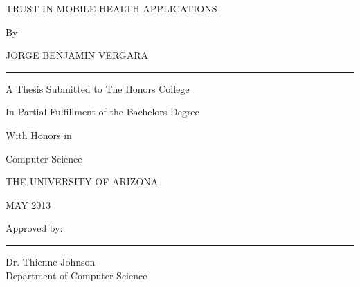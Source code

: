 \thispagestyle{empty}
\begin{center}
TRUST IN MOBILE HEALTH APPLICATIONS

By

JORGE BENJAMIN VERGARA

\vspace*{1 in}
\rule{1.5in}{.1pt}
\vspace*{1 in}

A Thesis Submitted to The Honors College

In Partial Fulfillment of the Bachelors Degree

With Honors in

Computer Science

THE UNIVERSITY OF ARIZONA

MAY 2013
\end{center}
\vfill
Approved by:

\vspace*{.3 in}
\rule{2in}{.1pt}

Dr. Thienne Johnson\\
Department of Computer Science